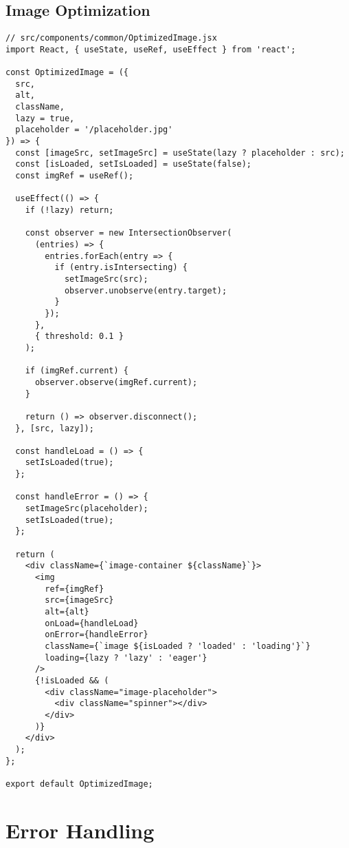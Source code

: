 \documentclass[12pt,a4paper]{article}
\begin{document}
\subsection{Image Optimization}
\begin{lstlisting}[caption=Optimized Image Component]
// src/components/common/OptimizedImage.jsx
import React, { useState, useRef, useEffect } from 'react';

const OptimizedImage = ({ 
  src, 
  alt, 
  className, 
  lazy = true,
  placeholder = '/placeholder.jpg'
}) => {
  const [imageSrc, setImageSrc] = useState(lazy ? placeholder : src);
  const [isLoaded, setIsLoaded] = useState(false);
  const imgRef = useRef();

  useEffect(() => {
    if (!lazy) return;

    const observer = new IntersectionObserver(
      (entries) => {
        entries.forEach(entry => {
          if (entry.isIntersecting) {
            setImageSrc(src);
            observer.unobserve(entry.target);
          }
        });
      },
      { threshold: 0.1 }
    );

    if (imgRef.current) {
      observer.observe(imgRef.current);
    }

    return () => observer.disconnect();
  }, [src, lazy]);

  const handleLoad = () => {
    setIsLoaded(true);
  };

  const handleError = () => {
    setImageSrc(placeholder);
    setIsLoaded(true);
  };

  return (
    <div className={`image-container ${className}`}>
      <img
        ref={imgRef}
        src={imageSrc}
        alt={alt}
        onLoad={handleLoad}
        onError={handleError}
        className={`image ${isLoaded ? 'loaded' : 'loading'}`}
        loading={lazy ? 'lazy' : 'eager'}
      />
      {!isLoaded && (
        <div className="image-placeholder">
          <div className="spinner"></div>
        </div>
      )}
    </div>
  );
};

export default OptimizedImage;
\end{lstlisting}

\section{Error Handling}
\end{document}
